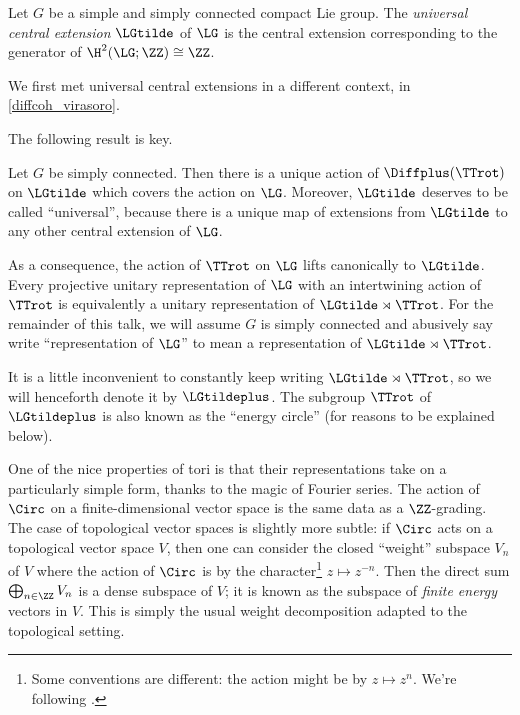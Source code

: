 
\begin{definition}
	Let $G$ be a simple and simply connected compact Lie group. The
	\emph{universal central extension} $\LGtilde$ of $\LG$ is the central
	extension corresponding to the generator of $\H^2(\LG; \ZZ) \cong \ZZ$.
\end{definition}
We first met universal central extensions in a different context, in \cref{diffcoh_virasoro}.


The following result is key.
\begin{theorem}
Let $G$ be simply connected. Then there is a unique action of $\Diffplus(\TTrot)$ on $\LGtilde$ which covers
	the action on $\LG$. Moreover, $\LGtilde$ deserves to be called
	``universal'', because there is a unique map of extensions from $\LGtilde$ to
	any other central extension of $\LG$.
\end{theorem}

\begin{remark}
	As a consequence, the action of $\TTrot$ on $\LG$ lifts canonically to
	$\LGtilde$. Every projective unitary representation of $\LG$ with an
	intertwining action of $\TTrot$ is equivalently a unitary representation
	of $\LGtilde\rtimes \TTrot$. For the remainder of this talk, we will assume $G$ is simply connected and
	abusively say write ``representation of $\LG$'' to mean a representation of $\LGtilde \rtimes \TTrot$.
\end{remark}

\begin{notation}
	It is a little inconvenient to constantly keep writing $\LGtilde\rtimes
	\TTrot$, so we will henceforth denote it by $\LGtildeplus$. The subgroup
	$\TTrot$ of $\LGtildeplus$ is also known as the ``energy circle'' (for
	reasons to be explained below).
\end{notation}

One of the nice properties of tori is that their representations take on a
particularly simple form, thanks to the magic of Fourier series. The action of
$\Circ$ on a finite-dimensional vector space is the same data as a $\ZZ$-grading.
The case of topological vector spaces is slightly more subtle: if $\Circ$ acts on
a topological vector space $V$, then one can consider the closed ``weight''
subspace $V_n$ of $V$ where the action of $\Circ$ is by the
character\footnote{Some conventions are different: the action might be by
$z\mapsto z^n$. We're following \cite{loop}.} $z\mapsto z^{-n}$. Then the direct
sum $\bigoplus_{n\in \ZZ} V_n$ is a dense subspace of $V$; it is known as the
subspace of \emph{finite energy} vectors in $V$. This is simply the usual weight
decomposition adapted to the topological setting.

